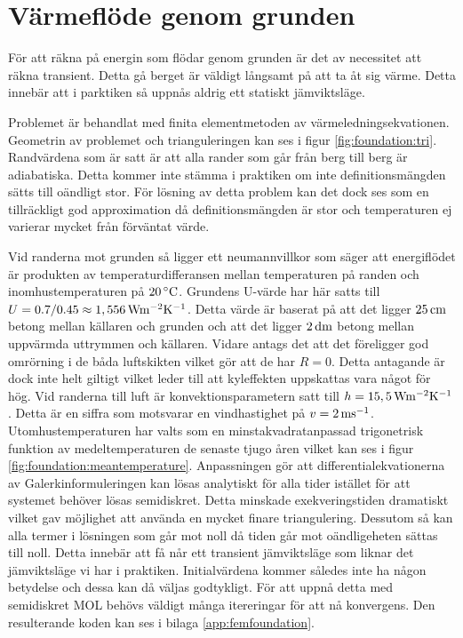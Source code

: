 \section{Värmeflöde genom grunden}

För att räkna på energin som flödar genom grunden är det av necessitet att räkna
transient. Detta gå berget är väldigt långsamt på att ta åt sig värme. Detta
innebär att i parktiken så uppnås aldrig ett statiskt jämviktsläge.

Problemet är behandlat med finita elementmetoden av värmeledningsekvationen.
Geometrin av problemet och trianguleringen kan ses i figur \ref{fig:foundation:tri}.
Randvärdena som är satt är att alla rander som går från berg till berg är adiabatiska.
Detta kommer inte stämma i praktiken om inte definitionsmängden sätts till oändligt
stor. För lösning av detta problem kan det dock ses som en tillräckligt god
approximation då definitionsmängden är stor och temperaturen ej varierar mycket
från förväntat värde.

Vid randerna mot grunden så ligger ett neumannvillkor som säger att energiflödet är produkten
av temperaturdifferansen mellan temperaturen på randen och inomhustemperaturen på $\unit[20]{^\circ C}$.
Grundens U-värde har här satts till $U = 0.7/0.45 \approx \unit[1,556]{ Wm^{-2}K^{-1}}$. Detta värde är
baserat på att det ligger $\unit[25]{cm}$ betong mellan källaren och grunden och att det ligger $\unit[2]{dm}$
betong mellan uppvärmda uttrymmen och källaren. Vidare antags det att det föreligger god omrörning i de båda
luftskikten vilket gör att de har $R=0$. Detta antagande är dock inte helt giltigt vilket leder till att kyleffekten
uppskattas vara något för hög.
Vid randerna till luft är konvektionsparametern satt
till $h = \unit[15,5]{Wm^{-2}K^{-1}}$. Detta är en siffra som motsvarar
en vindhastighet på $v = \unit[2]{ms^{-1}}$. Utomhustemperaturen har valts
som en minstakvadratanpassad trigonetrisk funktion av
medeltemperaturen de senaste tjugo åren vilket kan ses i figur
\ref{fig:foundation:meantemperature}. Anpassningen gör att
differentialekvationerna av Galerkinformuleringen kan lösas analytiskt
för alla tider istället för att systemet behöver lösas semidiskret.
Detta minskade exekveringstiden dramatiskt vilket gav möjlighet att använda en
mycket finare triangulering. Dessutom så kan alla termer i lösningen
som går mot noll då tiden går mot oändligeheten sättas till noll. Detta innebär
att få når ett transient jämviktsläge som liknar det jämviktsläge vi har i praktiken.
Initialvärdena kommer således inte ha någon betydelse och dessa kan då väljas
godtykligt. 
För att uppnå detta med semidiskret MOL behövs väldigt många itereringar för att
nå konvergens. Den resulterande koden kan ses i bilaga \ref{app:femfoundation}.

